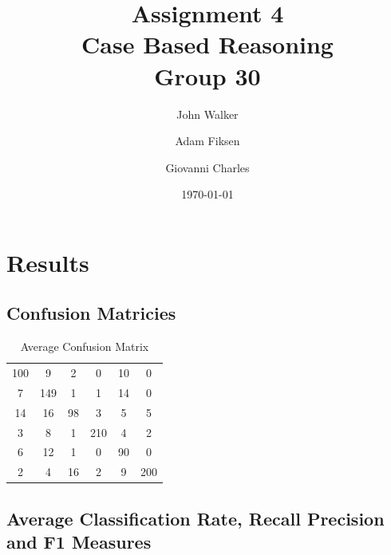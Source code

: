 \documentclass[11pt]{article}
\begin{document}
\title{Assignment 4\\ Case Based Reasoning \\ Group 30  }

\author{John Walker \and Adam Fiksen \and Giovanni Charles }

\date{\today}         %

\maketitle           %


\section{Results}

\subsection{Confusion Matricies}

\begin{table}[H]
\caption{Average Confusion Matrix} %
\centering %
\begin{tabular}{c c c c c c} %
\hline %
100  & 9     & 2     & 0     & 10  & 0   \\ %
7    & 149   & 1     & 1     & 14  & 0   \\
14   & 16    & 98    & 3     & 5   & 5   \\
3    & 8     & 1     & 210   & 4   & 2   \\
6    & 12    & 1     & 0     & 90  & 0   \\ 
2    & 4     & 16    & 2     & 9   & 200 \\ [1ex] %
\hline %
\end{tabular}
\label{table:conf} %
\end{table}


\subsection{Average Classification Rate, Recall Precision and F1 Measures}
\end{document}
